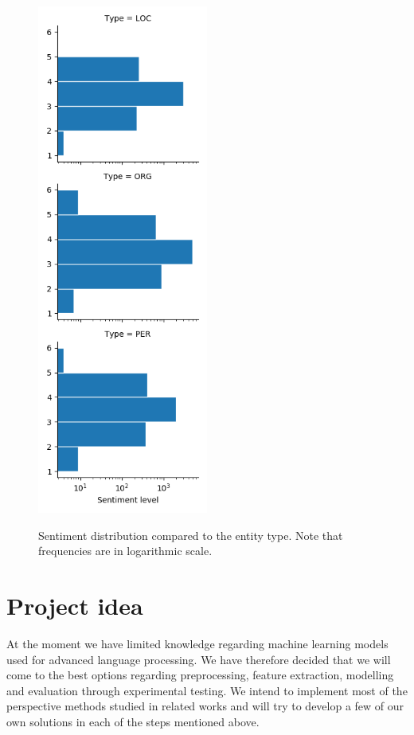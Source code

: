 \documentclass[11pt,a4paper]{article}
\begin{document}
\begin{figure}[H]
\includegraphics[width=0.5\textwidth]{resources/sentiment_distributions.png}
\centering
\label{fig:sentiment-distribution}
\caption{Sentiment distribution compared to the entity type. Note that frequencies are in logarithmic scale.}
\end{figure}

\section{Project idea}
At the moment we have limited knowledge regarding machine learning models used for advanced language processing. We have therefore decided that we will come to the best options regarding preprocessing, feature extraction, modelling and evaluation through experimental testing. We intend to implement most of the perspective methods studied in related works and will try to develop a few of our own solutions in each of the steps mentioned above.
\end{document}

